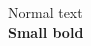 \documentclass{article}
\begin{document}
Normal text\\

{\small \textbf{Small bold}}\\
\end{document}
